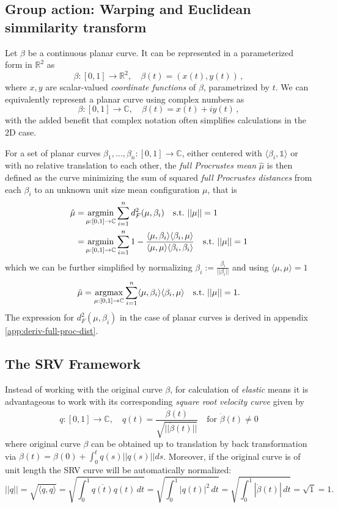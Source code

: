 \subsection{Group action: Warping and Euclidean simmilarity transform}


Let $\beta$ be a continuous planar curve.
It can be represented in a parameterized form in $\mathbb{R}^2$ as
$$ \beta : [0,1] \rightarrow \mathbb{R}^2,\quad \beta(t) = ( x(t), y(t)) \,, $$
where $x, y$ are scalar-valued \textit{coordinate functions} of $\beta$, parametrized by $t$.
We can equivalently represent a planar curve using complex numbers as
$$ \beta : [0,1] \rightarrow \mathbb{C},\quad \beta(t) = x(t) + iy(t) \,, $$
with the added benefit that complex notation often simplifies calculations in the 2D case.

For a set of planar curves $\beta_1,\dots,\beta_n : [0,1] \rightarrow \mathbb{C}$, either centered with $\langle \beta_i, \mathbb{1} \rangle$ or with no relative translation to each other, the \textit{full Procrustes mean} $\hat{\mu}$ is then defined as the curve minimizing the sum of squared \textit{full Procrustes distances} from each $\beta_i$ to an unknown unit size mean configuration $\mu$, that is
\begin{align*}
    \hat{\mu} =& \operatorname*{argmin}_{\mu:[0,1]\rightarrow\mathbb{C}} \sum_{i=1}^n d^2_F(\mu,\beta_i)
    \quad\text{s.t.}\,\, ||\mu|| = 1 \\
    =& \operatorname*{argmin}_{\mu:[0,1]\rightarrow\mathbb{C}} \sum_{i=1}^n 1 - \frac{\langle \mu, \beta_i \rangle \langle \beta_i, \mu \rangle}{\langle \mu, \mu \rangle \langle \beta_i, \beta_i \rangle}
    \quad\text{s.t.}\,\, ||\mu|| = 1
\end{align*}
which we can be further simplified by normalizing $\beta_i := \frac{\beta_i}{|| \beta_i ||}$ and using $\langle \mu, \mu \rangle = 1$
$$ \hat{\mu} = \operatorname*{argmax}_{\mu:[0,1]\rightarrow\mathbb{C}} \sum_{i=1}^n \langle \mu, \beta_i \rangle \langle \beta_i, \mu \rangle \quad\text{s.t.}\,\, ||\mu|| = 1. $$
The expression for $d^2_F(\mu,\beta_i)$ in the case of planar curves is derived in appendix \ref{app:deriv-full-proc-dist}.


\subsection{The SRV Framework}
Instead of working with the original curve $\beta$, for calculation of \textit{elastic} means it is advantageous to work with its corresponding \textit{square root velocity curve} given by
$$ q : [0, 1] \rightarrow \mathbb{C}, \quad q(t) = \frac{\dot{\beta}(t)}{\sqrt{|| \dot{\beta}(t) ||}} \quad \text{for} \,\, \dot{\beta}(t) \neq 0 $$
where original curve $\beta$ can be obtained up to translation by back transformation via $\beta(t) = \beta(0) + \int_0^t q(s) || q(s) || ds$.
Moreover, if the original curve is of unit length the SRV curve will be automatically normalized:
$$ ||q|| = \sqrt{\langle q, q \rangle} = \sqrt{ \int_0^1 \overline{q(t)} q(t) \, dt } = \sqrt{ \int_0^1 |q(t)|^2 \, dt} = \sqrt{\int_0^1 |\dot{\beta}(t)| \, dt} = \sqrt{1} = 1. $$



